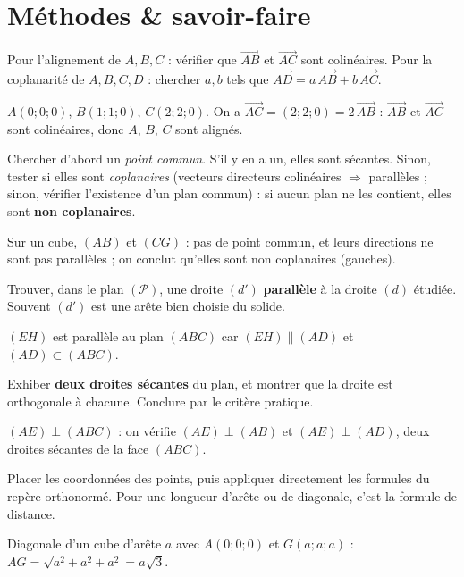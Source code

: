 \section{Méthodes \& savoir-faire}

Pour l'alignement de $A,B,C$ : vérifier que $\overrightarrow{AB}$ et
$\overrightarrow{AC}$ sont colinéaires. Pour la coplanarité de $A,B,C,D$ : chercher
$a,b$ tels que $\overrightarrow{AD}=a\,\overrightarrow{AB}+b\,\overrightarrow{AC}$.
\begin{exemple}
$A(0;0;0)$, $B(1;1;0)$, $C(2;2;0)$. On a $\overrightarrow{AC}=(2;2;0)=2\,
\overrightarrow{AB}$ : $\overrightarrow{AB}$ et $\overrightarrow{AC}$ sont
colinéaires, donc $A$, $B$, $C$ sont alignés.
\end{exemple}

Chercher d'abord un \emph{point commun}. S'il y en a un, elles sont sécantes. Sinon,
tester si elles sont \emph{coplanaires} (vecteurs directeurs colinéaires
$\Rightarrow$ parallèles ; sinon, vérifier l'existence d'un plan commun) : si aucun
plan ne les contient, elles sont \textbf{non coplanaires}.
\begin{exemple}
Sur un cube, $(AB)$ et $(CG)$ : pas de point commun, et leurs directions ne sont pas
parallèles ; on conclut qu'elles sont non coplanaires (gauches).
\end{exemple}

Trouver, dans le plan $(\mathcal{P})$, une droite $(d')$ \textbf{parallèle} à la
droite $(d)$ étudiée. Souvent $(d')$ est une arête bien choisie du solide.
\begin{exemple}
$(EH)$ est parallèle au plan $(ABC)$ car $(EH)\parallel(AD)$ et $(AD)\subset(ABC)$.
\end{exemple}

Exhiber \textbf{deux droites sécantes} du plan, et montrer que la droite est
orthogonale à chacune. Conclure par le critère pratique.
\begin{exemple}
$(AE)\perp(ABC)$ : on vérifie $(AE)\perp(AB)$ et $(AE)\perp(AD)$, deux droites
sécantes de la face $(ABC)$.
\end{exemple}

Placer les coordonnées des points, puis appliquer directement les formules du
repère orthonormé. Pour une longueur d'arête ou de diagonale, c'est la formule de
distance.
\begin{exemple}
Diagonale d'un cube d'arête $a$ avec $A(0;0;0)$ et $G(a;a;a)$ :
$AG=\sqrt{a^2+a^2+a^2}=a\sqrt{3}$.
\end{exemple}

